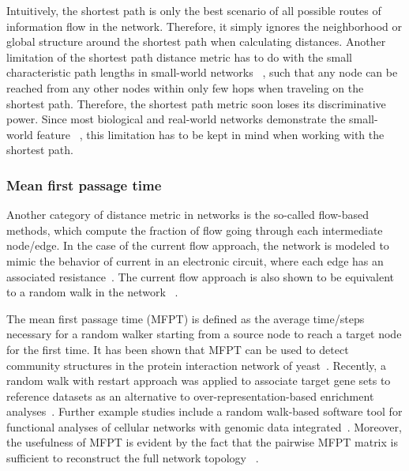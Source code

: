 Intuitively, the shortest path is only the best scenario of all possible routes
of information flow in the network. Therefore, it simply ignores the 
neighborhood or global structure around the shortest path when calculating
distances. Another limitation of the shortest path distance metric has to do
with the small characteristic path lengths in small-world networks~%
\citep{Milgram1967,Watts1998}, such that any node can be reached from any other nodes
within only few hops when traveling on the shortest path.
Therefore, the shortest path
metric soon loses its discriminative power. Since most biological
and real-world networks demonstrate the small-world feature~%
\citep{Barabasi2004}, this limitation
has to be kept in mind when working with the shortest path.

\subsubsection{Mean first passage time}
Another category of distance metric in networks is the 
so-called flow-based methods, which compute the fraction of flow going through each intermediate node/edge. In the case of the current flow approach, the network is modeled to mimic the behavior of current in an electronic circuit, where each edge has an associated resistance~\citep{Missiuro2009}. The current flow approach is
also shown to be equivalent to a random walk in the network~%
\citep{Doyle2000}.

The mean first passage time (MFPT) is defined as the average time/steps 
necessary for 
a random walker starting from a source node to reach a target node for the
first time. It has been shown that MFPT can be used to detect community
structures in the protein interaction network of yeast~\citep{Zhou2003}. 
Recently, a random walk with restart approach was applied to associate
target gene sets to reference datasets as an alternative to 
over-representation-based enrichment analyses~\citep{Glaab2012}. 
Further example studies include a random walk-based software tool for functional
analyses of cellular networks with genomic data integrated~\citep{Komurov2012a}.
Moreover,
the usefulness of MFPT is evident by the fact that the pairwise MFPT 
matrix is sufficient to reconstruct the full network topology~%
\citep{Wittmann2009}.

